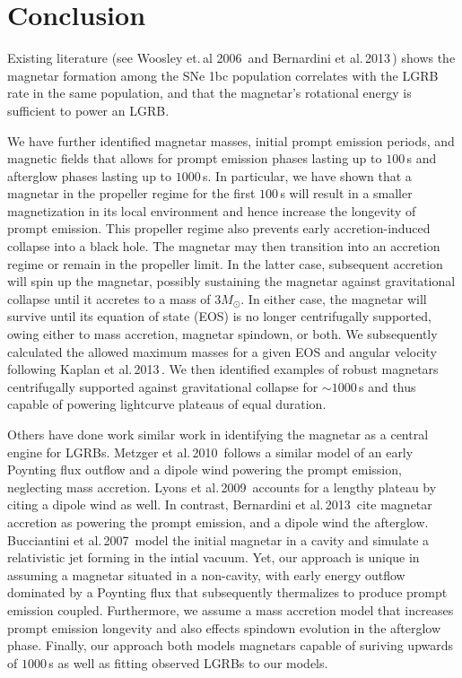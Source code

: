 \documentclass{article}
\begin{document}
\section{Conclusion}

Existing literature (see Woosley et.\,al 2006\,\cite{Woosley:2006fn} and Bernardini et al.\,2013\,\cite{Bernardini:2013nfa}) shows the magnetar formation among the SNe 1bc population correlates with the LGRB rate in the same population, and that the magnetar's rotational energy is sufficient to power an LGRB.

We have further identified magnetar masses, initial prompt emission periods, and magnetic fields that allows for prompt emission phases lasting up to $100$\,s and afterglow phases lasting up to $1000$\,s. In particular, we have shown that a magnetar in the propeller regime for the first $100$\,s will result in a smaller magnetization in its local environment and hence increase the longevity of prompt emission. This propeller regime also prevents early accretion-induced collapse into a black hole. The magnetar may then transition into an accretion regime or remain in the propeller limit. In the latter case, subsequent accretion will spin up the magnetar, possibly sustaining the magnetar against gravitational collapse until it accretes to a mass of $3M_{\odot}$. In either case, the magnetar will survive until its equation of state (EOS) is no longer centrifugally supported, owing either to mass accretion, magnetar spindown, or both. We subsequently calculated the allowed maximum masses for a given EOS and angular velocity following Kaplan et al.\,2013\,\cite{Kaplan:2013wra}. We then identified examples of robust magnetars centrifugally supported against gravitational collapse for $\sim 1000$\,s and thus capable of powering lightcurve plateaus of equal duration.

Others have done work similar work in identifying the magnetar as a central engine for LGRBs. Metzger et al.\,2010\,\cite{Metzger:2010pp} follows a similar model of an early Poynting flux outflow and a dipole wind powering the prompt emission, neglecting mass accretion. Lyons et al.\,2009\,\cite{Lyons:2009ka} accounts for a lengthy plateau by citing a dipole wind as well. In contrast, Bernardini et al.\,2013\,\cite{Bernardini:2013nfa} cite magnetar accretion as powering the prompt emission, and a dipole wind the afterglow. Bucciantini et al.\,2007\,\cite{Bucciantini:2007hy} model the initial magnetar in a cavity and simulate a relativistic jet forming in the intial vacuum. Yet, our approach is unique in assuming a magnetar situated in a non-cavity, with early energy outflow dominated by a Poynting flux that subsequently thermalizes to produce prompt emission coupled. Furthermore, we assume a mass accretion model that increases prompt emission longevity and also effects spindown evolution in the afterglow phase. Finally, our approach both models magnetars capable of suriving upwards of $1000$\,s as well as fitting observed LGRBs to our models.
\end{document}
